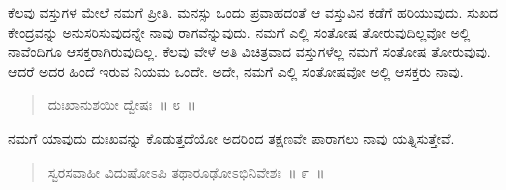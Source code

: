 \vspace{-0.4cm}


\vskip 0.2cm 

ಕೆಲವು ವಸ್ತುಗಳ ಮೇಲೆ ನಮಗೆ ಪ್ರೀತಿ. ಮನಸ್ಸು ಒಂದು ಪ್ರವಾಹದಂತೆ ಆ ವಸ್ತುವಿನ ಕಡೆಗೆ ಹರಿಯುವುದು. ಸುಖದ ಕೇಂದ್ರವನ್ನು ಅನುಸರಿಸುವುದನ್ನೇ ನಾವು ರಾಗವೆನ್ನುವುದು. ನಮಗೆ ಎಲ್ಲಿ ಸಂತೋಷ ತೋರುವುದಿಲ್ಲವೋ ಅಲ್ಲಿ ನಾವೆಂದಿಗೂ ಆಸಕ್ತರಾಗಿರುವುದಿಲ್ಲ. ಕೆಲವು ವೇಳೆ ಅತಿ ವಿಚಿತ್ರವಾದ ವಸ್ತುಗಳೆಲ್ಲ ನಮಗೆ ಸಂತೋಷ ತೋರುವುವು. ಆದರೆ ಅದರ ಹಿಂದೆ ಇರುವ ನಿಯಮ ಒಂದೇ. ಅದೇ, ನಮಗೆ ಎಲ್ಲಿ ಸಂತೋಷವೋ ಅಲ್ಲಿ ಆಸಕ್ತರು ನಾವು. 

\vspace{-0.2cm}

\begin{verse}
ದುಃಖಾನುಶಯೀ ದ್ವೇಷಃ~॥ ೮~॥
\end{verse}

\vspace{-0.4cm}


\vskip 0.2cm 

ನಮಗೆ ಯಾವುದು ದುಃಖವನ್ನು ಕೊಡುತ್ತದೆಯೋ ಅದರಿಂದ ತಕ್ಷಣವೇ ಪಾರಾಗಲು ನಾವು ಯತ್ನಿಸುತ್ತೇವೆ. 

\vskip 0.1cm 

\vspace{-0.2cm}

\begin{verse}
ಸ್ವರಸವಾಹೀ ವಿದುಷೋಽಪಿ ತಥಾರೂಢೋಽಭಿನಿವೇಶಃ~॥ ೯~॥
\end{verse}

\vspace{-0.4cm}


\vskip 0.2cm 

